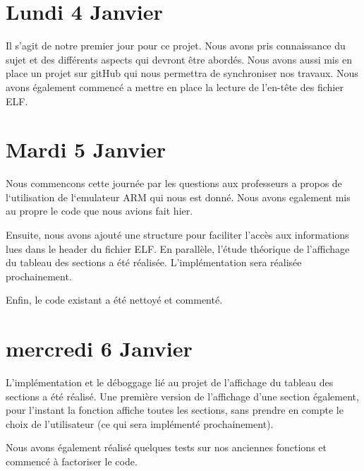\documentclass[12pt, a4paper]{article}
\begin{document}
\section{Lundi 4 Janvier}

Il s'agit de notre premier jour pour ce projet. Nous avons pris 
connaissance du sujet et des différents aspects qui devront être 
abordés. Nous avons aussi mis en place un projet sur gitHub qui nous 
permettra de synchroniser nos travaux. Nous avons également 
commencé a mettre en place la lecture de l'en-t\^ete des fichier 
ELF.

\section{Mardi 5 Janvier}

Nous commencons cette journée par les questions aux professeurs a propos de 
l`utilisation de l`emulateur ARM qui nous est donn\'e. Nous avons egalement 
mis au propre le code que nous avions fait hier.

Ensuite, nous avons ajouté une structure pour faciliter l'accès aux informations lues dans le header du fichier ELF.
En parallèle, l'étude théorique de l'affichage du tableau des sections a été réalisée. L'implémentation sera réalisée prochainement.

Enfin, le code existant a été nettoyé et commenté.

\section{mercredi 6 Janvier}

L'implémentation et le déboggage lié au projet de l'affichage du tableau des sections a été réalisé.
Une première version de l'affichage d'une section également, pour l'instant la fonction affiche toutes les sections, sans prendre en compte le choix de l'utilisateur (ce qui sera implémenté prochainement).

Nous avons également réalisé quelques tests sur nos anciennes fonctions et commencé à factoriser le code.
\end{document}

